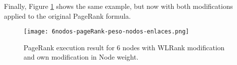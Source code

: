 Finally, Figure \ref{fig:6nodos-pageRank-peso-nodos-enlaces} shows the same example, but now with both modifications applied to the original PageRank formula.

\begin{figure}
	\centering
	\texttt{[image: 6nodos-pageRank-peso-nodos-enlaces.png]}
	\caption{PageRank execution result for 6 nodes with WLRank modification and own modification in Node weight.} 
	\label{fig:6nodos-pageRank-peso-nodos-enlaces}
\end{figure}


